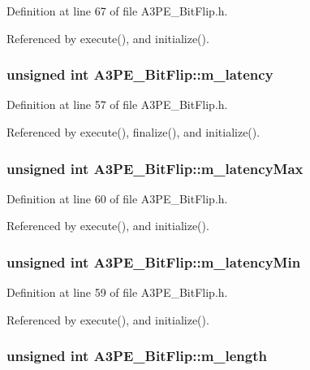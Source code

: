Definition at line 67 of file A3PE\_\-BitFlip.h.

Referenced by execute(), and initialize().\hypertarget{classA3PE__BitFlip_a6f5ad1d6595e98c2fbd58f43e2754322}{
\subsubsection[{m\_\-latency}]{\setlength{\rightskip}{0pt plus 5cm}unsigned int {\bf A3PE\_\-BitFlip::m\_\-latency}}}
\label{classA3PE__BitFlip_a6f5ad1d6595e98c2fbd58f43e2754322}


Definition at line 57 of file A3PE\_\-BitFlip.h.

Referenced by execute(), finalize(), and initialize().\hypertarget{classA3PE__BitFlip_adfeac5a7ab09d89f0d0146113dd55dde}{
\subsubsection[{m\_\-latencyMax}]{\setlength{\rightskip}{0pt plus 5cm}unsigned int {\bf A3PE\_\-BitFlip::m\_\-latencyMax}}}
\label{classA3PE__BitFlip_adfeac5a7ab09d89f0d0146113dd55dde}


Definition at line 60 of file A3PE\_\-BitFlip.h.

Referenced by execute(), and initialize().\hypertarget{classA3PE__BitFlip_aeae11ece90351542cae8e0590d9162ee}{
\subsubsection[{m\_\-latencyMin}]{\setlength{\rightskip}{0pt plus 5cm}unsigned int {\bf A3PE\_\-BitFlip::m\_\-latencyMin}}}
\label{classA3PE__BitFlip_aeae11ece90351542cae8e0590d9162ee}


Definition at line 59 of file A3PE\_\-BitFlip.h.

Referenced by execute(), and initialize().\hypertarget{classA3PE__BitFlip_aba0564f2bb8a8ab549da428171d6a3d6}{
\subsubsection[{m\_\-length}]{\setlength{\rightskip}{0pt plus 5cm}unsigned int {\bf A3PE\_\-BitFlip::m\_\-length}}}
\label{classA3PE__BitFlip_aba0564f2bb8a8ab549da428171d6a3d6}


